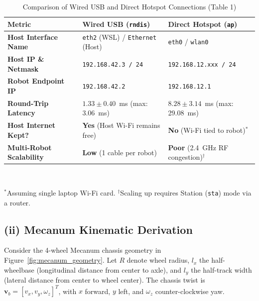 \documentclass[11pt,a4paper]{article}
\begin{document}
\begin{table}[htbp]
\centering
\caption{Comparison of Wired USB and Direct Hotspot Connections (Table 1)}
\label{tab:network_topology}
\vspace{0.2cm}
\begin{tabular}{>{\raggedright\arraybackslash}p{4.4cm} >{\raggedright\arraybackslash}p{5.0cm} >{\raggedright\arraybackslash}p{5.0cm}}
\toprule
\textbf{Metric} & \textbf{Wired USB (\texttt{rndis})} & \textbf{Direct Hotspot (\texttt{ap})} \\
\midrule
\textbf{Host Interface Name} & \texttt{eth2} (WSL) / \texttt{Ethernet} (Host) & \texttt{eth0} / \texttt{wlan0} \\
\textbf{Host IP \& Netmask} & \texttt{192.168.42.3 / 24} & \texttt{192.168.12.xxx / 24} \\
\textbf{Robot Endpoint IP} & \texttt{192.168.42.2} & \texttt{192.168.12.1} \\
\textbf{Round-Trip Latency} & $1.33 \pm 0.40$~ms (max: 3.06~ms) & $8.28 \pm 3.14$~ms (max: 29.08~ms) \\
\textbf{Host Internet Kept?} & \textbf{Yes} (Host Wi-Fi remains free) & \textbf{No} (Wi-Fi tied to robot)$^*$ \\
\textbf{Multi-Robot Scalability} & \textbf{Low} (1 cable per robot) & \textbf{Poor} (2.4~GHz RF congestion)$^\dagger$ \\
\bottomrule
\end{tabular}
\vspace{0.15cm}\\
\raggedright \footnotesize{$^*$Assuming single laptop Wi-Fi card. $^\dagger$Scaling up requires Station (\texttt{sta}) mode via a router.}
\end{table}

\subsection*{(ii) Mecanum Kinematic Derivation}
Consider the 4-wheel Mecanum chassis geometry in Figure~\ref{fig:mecanum_geometry}. Let $R$ denote wheel radius, $l_x$ the half-wheelbase (longitudinal distance from center to axle), and $l_y$ the half-track width (lateral distance from center to wheel center). The chassis twist is $\mathbf{v}_b = [v_x, v_y, \omega_z]^T$, with $x$ forward, $y$ left, and $\omega_z$ counter-clockwise yaw.
\end{document}
